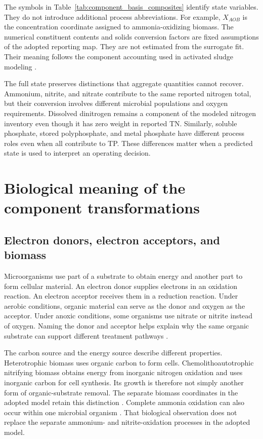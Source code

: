 The symbols in Table~\ref{tab:component_basis_composites} identify state variables. They do not introduce additional process abbreviations. For example, $X_{AOB}$ is the concentration coordinate assigned to ammonia-oxidizing biomass. The numerical constituent contents and solids conversion factors are fixed assumptions of the adopted reporting map. They are not estimated from the surrogate fit. Their meaning follows the component accounting used in activated sludge modeling \citep{Henze2006}.

The full state preserves distinctions that aggregate quantities cannot recover. Ammonium, nitrite, and nitrate contribute to the same reported nitrogen total, but their conversion involves different microbial populations and oxygen requirements. Dissolved dinitrogen remains a component of the modeled nitrogen inventory even though it has zero weight in reported TN. Similarly, soluble phosphate, stored polyphosphate, and metal phosphate have different process roles even when all contribute to TP. These differences matter when a predicted state is used to interpret an operating decision.


\section{Biological meaning of the component transformations}

\subsection{Electron donors, electron acceptors, and biomass}

Microorganisms use part of a substrate to obtain energy and another part to form cellular material. An electron donor supplies electrons in an oxidation reaction. An electron acceptor receives them in a reduction reaction. Under aerobic conditions, organic material can serve as the donor and oxygen as the acceptor. Under anoxic conditions, some organisms use nitrate or nitrite instead of oxygen. Naming the donor and acceptor helps explain why the same organic substrate can support different treatment pathways \citep{Narayanan2019,Preena2021}.

The carbon source and the energy source describe different properties. Heterotrophic biomass uses organic carbon to form cells. Chemolithoautotrophic nitrifying biomass obtains energy from inorganic nitrogen oxidation and uses inorganic carbon for cell synthesis. Its growth is therefore not simply another form of organic-substrate removal. The separate biomass coordinates in the adopted model retain this distinction \citep{Henze2006,Guerrero2011}. Complete ammonia oxidation can also occur within one microbial organism \citep{VanKessel2015}. That biological observation does not replace the separate ammonium- and nitrite-oxidation processes in the adopted model.

